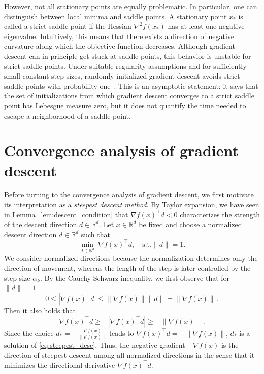 \documentclass[12pt,openany]{book}
\theoremstyle{definition}
\theoremstyle{definition}
\newcommand{\R}{\mathbb{R}}
\begin{document}
However, not all stationary points are equally problematic. In particular, one can distinguish
between local minima and saddle points. A stationary point $x_\ast$ is called a strict saddle point
if the Hessian $\nabla^2 f(x_\ast)$ has at least one negative eigenvalue. Intuitively, this means that
there exists a direction of negative curvature along which the objective function decreases. Although gradient descent can in principle get stuck at saddle points, this behavior is unstable
for strict saddle points. Under suitable regularity assumptions and for sufficiently small constant step sizes, randomly initialized gradient descent avoids strict saddle points with probability one~\cite{lee_first-order_2019}. This is an
asymptotic statement: it says that the set of initializations from which gradient descent converges to a strict saddle point has Lebesgue measure zero, but it does not quantify the time needed to escape a neighborhood of a saddle point.

\section{Convergence analysis of gradient descent}
Before turning to the convergence analysis of gradient descent, we first motivate its interpretation as a \textit{steepest descent method}. By Taylor expansion, we have seen in Lemma~\ref{lem:descent_condition} that $\nabla f(x)^\top d<0$ characterizes the strength of the descent direction $d\in \R^d$. Let $x\in\R^d$ be fixed and choose a normalized descent direction $d\in\R^d$ such that 
\begin{equation}\label{eq:steepest_desc} 
\min_{d\in\R^d}\ \nabla f(x)^\top d,\quad \text{s.t.} \|d\|=1.
\end{equation}
We consider normalized directions because the normalization determines only the direction of movement, whereas the length of the step is later controlled by the step size $\alpha_k$. By the Cauchy-Schwarz inequality, we first observe that for $\|d\|=1$ 
\[0\le |\nabla f(x)^\top d| \le \|\nabla f(x)\| \|d\| = \|\nabla f(x)\|\, .\]
Then it also holds that
\[\nabla f(x)^\top d\ge -|\nabla f(x)^\top d|\ge -\|\nabla f(x)\|\,.\]
Since the choice $d_\ast=-\frac{\nabla f(x)}{\|\nabla f(x)\|}$ leads to $\nabla f(x)^\top d = -\|\nabla f(x)\|$, $d_\ast$ is a solution of \eqref{eq:steepest_desc}. Thus, the negative gradient $-\nabla f(x)$ is the direction of steepest descent among all normalized directions in the sense that it minimizes the directional derivative $\nabla f(x)^\top d$. 
\end{document}
